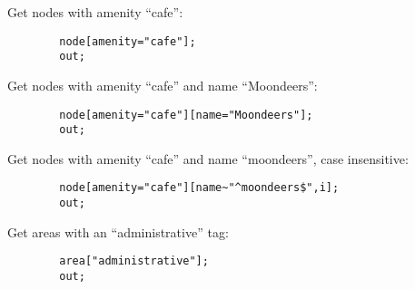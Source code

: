 \documentclass[main.tex]{subfiles}
\begin{document}
\pagebreak %
\begin{example}
    Get nodes with amenity ``cafe'':
    \begin{lstwrap}\begin{lstlisting}
        node[amenity="cafe"];
        out;
    \end{lstlisting}\end{lstwrap}

    Get nodes with amenity ``cafe'' and name ``Moondeers'':
    \begin{lstwrap}\begin{lstlisting}
        node[amenity="cafe"][name="Moondeers"];
        out;
    \end{lstlisting}\end{lstwrap}

    Get nodes with amenity ``cafe'' and name ``moondeers'', case insensitive:
    \begin{lstwrap}\begin{lstlisting}
        node[amenity="cafe"][name~"^moondeers$",i];
        out;
    \end{lstlisting}\end{lstwrap}

    Get areas with an ``administrative'' tag:
    \begin{lstwrap}\begin{lstlisting}
        area["administrative"];
        out;
    \end{lstlisting}\end{lstwrap}
\end{example}
\end{document}
